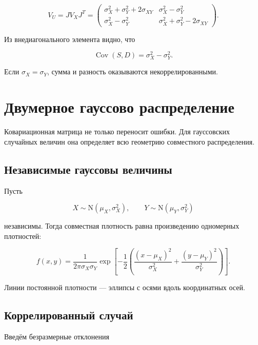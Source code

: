 \documentclass[
  russian,
  12pt,
  a4paper,
  a4paper,
  openany]{scrbook}
\begin{document}
\[
\boxed{
V_U
=JV_XJ^T
=
\begin{pmatrix}
\sigma_X^2+\sigma_Y^2+2\sigma_{XY}&\sigma_X^2-\sigma_Y^2\\
\sigma_X^2-\sigma_Y^2&\sigma_X^2+\sigma_Y^2-2\sigma_{XY}
\end{pmatrix}.
}
\]

Из внедиагонального элемента видно, что

\[
\operatorname{Cov}(S,D)=\sigma_X^2-\sigma_Y^2.
\]

Если \(\sigma_X=\sigma_Y\), сумма и разность оказываются
некоррелированными.

\section{Двумерное гауссово
распределение}\label{ux434ux432ux443ux43cux435ux440ux43dux43eux435-ux433ux430ux443ux441ux441ux43eux432ux43e-ux440ux430ux441ux43fux440ux435ux434ux435ux43bux435ux43dux438ux435}

Ковариационная матрица не только переносит ошибки. Для гауссовских
случайных величин она определяет всю геометрию совместного
распределения.

\subsection{Независимые гауссовы
величины}\label{ux43dux435ux437ux430ux432ux438ux441ux438ux43cux44bux435-ux433ux430ux443ux441ux441ux43eux432ux44b-ux432ux435ux43bux438ux447ux438ux43dux44b}

Пусть

\[
X\sim\mathrm N(\mu_X,\sigma_X^2),
\qquad
Y\sim\mathrm N(\mu_Y,\sigma_Y^2)
\]

независимы. Тогда совместная плотность равна произведению одномерных
плотностей:

\[
\boxed{
f(x,y)
=
\frac{1}{2\pi\sigma_X\sigma_Y}
\exp\!\left[
-\frac12\left(
\frac{(x-\mu_X)^2}{\sigma_X^2}
+
\frac{(y-\mu_Y)^2}{\sigma_Y^2}
\right)
\right].
}
\]

Линии постоянной плотности --- эллипсы с осями вдоль координатных осей.

\subsection{Коррелированный
случай}\label{ux43aux43eux440ux440ux435ux43bux438ux440ux43eux432ux430ux43dux43dux44bux439-ux441ux43bux443ux447ux430ux439}

Введём безразмерные отклонения
\end{document}
